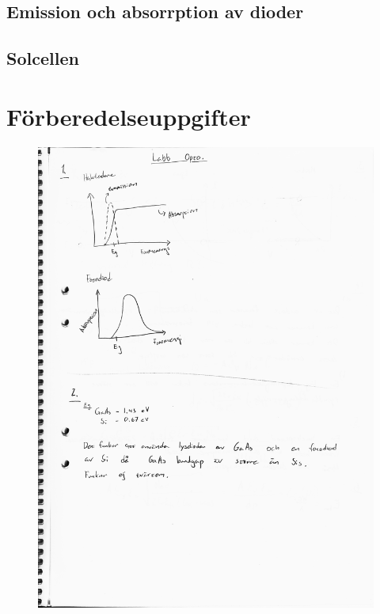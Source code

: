 \documentclass[a4paper]{article}
\begin{document}
\subsection{Emission och absorrption av dioder}

\subsection{Solcellen}


\newpage
\section{Förberedelseuppgifter}
\begin{figure}[H]
\centering
\includegraphics[scale=.7]{frb1.jpeg}
\end{figure}
\newpage
\end{document}
